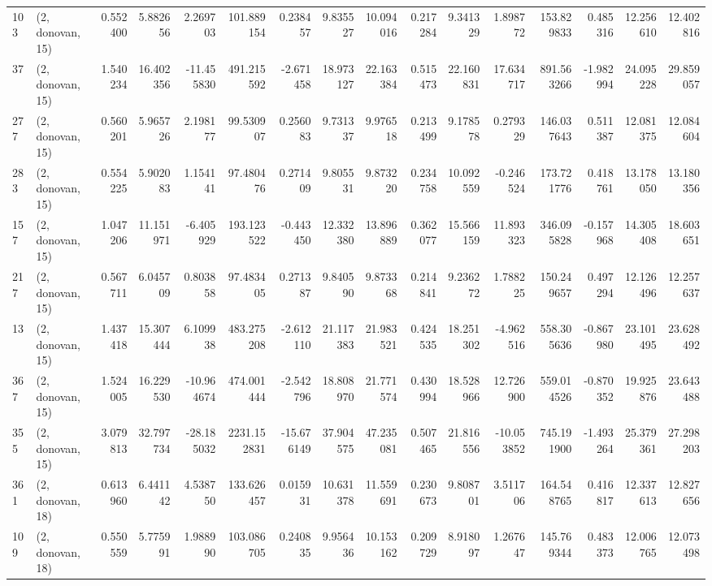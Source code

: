 \begin{tabular}{llrrrrrrrrrrrrrr}
103 &  (2, donovan, 15) &   0.552400 &   5.882656 &   2.269703 &   101.889154 &   0.238457 &   9.835527 &  10.094016 &  0.217284 &   9.341329 &   1.898772 &   153.829833 &  0.485316 &  12.256610 &  12.402816 \\
37  &  (2, donovan, 15) &   1.540234 &  16.402356 & -11.455830 &   491.215592 &  -2.671458 &  18.973127 &  22.163384 &  0.515473 &  22.160831 &  17.634717 &   891.563266 & -1.982994 &  24.095228 &  29.859057 \\
277 &  (2, donovan, 15) &   0.560201 &   5.965726 &   2.198177 &    99.530907 &   0.256083 &   9.731337 &   9.976518 &  0.213499 &   9.178578 &   0.279329 &   146.037643 &  0.511387 &  12.081375 &  12.084604 \\
283 &  (2, donovan, 15) &   0.554225 &   5.902083 &   1.154141 &    97.480476 &   0.271409 &   9.805531 &   9.873220 &  0.234758 &  10.092559 &  -0.246524 &   173.721776 &  0.418761 &  13.178050 &  13.180356 \\
157 &  (2, donovan, 15) &   1.047206 &  11.151971 &  -6.405929 &   193.123522 &  -0.443450 &  12.332380 &  13.896889 &  0.362077 &  15.566159 &  11.893323 &   346.095828 & -0.157968 &  14.305408 &  18.603651 \\
217 &  (2, donovan, 15) &   0.567711 &   6.045709 &   0.803858 &    97.483405 &   0.271387 &   9.840590 &   9.873368 &  0.214841 &   9.236272 &   1.788225 &   150.249657 &  0.497294 &  12.126496 &  12.257637 \\
13  &  (2, donovan, 15) &   1.437418 &  15.307444 &   6.109938 &   483.275208 &  -2.612110 &  21.117383 &  21.983521 &  0.424535 &  18.251302 &  -4.962516 &   558.305636 & -0.867980 &  23.101495 &  23.628492 \\
367 &  (2, donovan, 15) &   1.524005 &  16.229530 & -10.964674 &   474.001444 &  -2.542796 &  18.808970 &  21.771574 &  0.430994 &  18.528966 &  12.726900 &   559.014526 & -0.870352 &  19.925876 &  23.643488 \\
355 &  (2, donovan, 15) &   3.079813 &  32.797734 & -28.185032 &  2231.152831 & -15.676149 &  37.904575 &  47.235081 &  0.507465 &  21.816556 & -10.053852 &   745.191900 & -1.493264 &  25.379361 &  27.298203 \\
361 &  (2, donovan, 18) &   0.613960 &   6.441142 &   4.538750 &   133.626457 &   0.015931 &  10.631378 &  11.559691 &  0.230673 &   9.808701 &   3.511706 &   164.548765 &  0.416817 &  12.337613 &  12.827656 \\
109 &  (2, donovan, 18) &   0.550559 &   5.775991 &   1.988990 &   103.086705 &   0.240835 &   9.956436 &  10.153162 &  0.209729 &   8.918097 &   1.267647 &   145.769344 &  0.483373 &  12.006765 &  12.073498 \\

\end{tabular}
